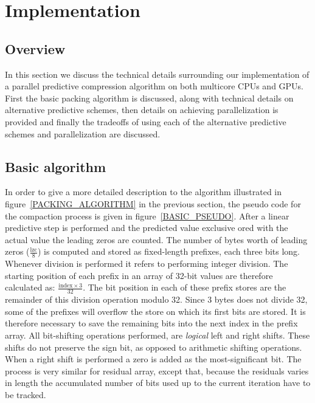 \section{Implementation}
 \subsection{Overview}
 In this section we discuss the technical details surrounding our implementation of a parallel predictive compression algorithm on both multicore CPUs and GPUs. First the basic 
 packing algorithm is discussed, along with technical details on alternative predictive schemes, then details on achieving parallelization is provided and finally the tradeoffs 
 of using each of the alternative predictive schemes and parallelization are discussed. 
 \subsection{Basic algorithm}
 \label{sec:basicScheme}
  In order to give a more detailed description to the algorithm illustrated in figure~\ref{PACKING_ALGORITHM} in the previous section, the pseudo code for the compaction
  process is given in figure~\ref{BASIC_PSEUDO}. After a linear predictive step is performed and the predicted value exclusive ored with the actual value the leading zeros are 
  counted. The number of bytes worth of leading zeros ($\frac{\text{lzc}}{8}$) is computed and stored as fixed-length prefixes, each three bits long. Whenever division is performed it
  refers to performing integer division. The starting position of each prefix in an array of 32-bit values are therefore calculated as: $\frac{\text{index}\times 3}{32}$. The bit position in
  each of these prefix stores are the remainder of this division operation modulo 32. Since 3 bytes does not divide 32, some of the prefixes will overflow the store on which its first
  bits are stored. It is therefore necessary to save the remaining bits into the next index in the prefix array. All bit-shifting operations performed, are \emph{logical}
  left and right shifts. These shifts do not preserve the sign bit, as opposed to arithmetic shifting operations. When a right shift is performed a zero is added as the 
  most-significant bit. The process is very similar for residual array, except that, because the residuals varies in length the accumulated number of bits used up to the current 
  iteration have to be tracked. 
